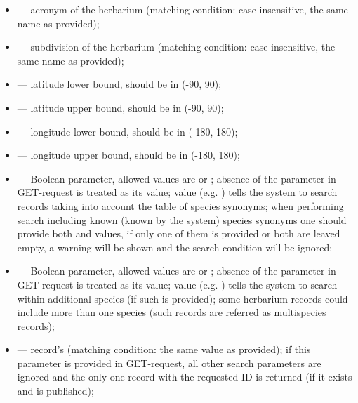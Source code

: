 \documentclass[letterpaper,10pt,english]{sphinxmanual}
\begin{document}
\begin{itemize}
\item {} 
 — acronym of the herbarium (matching condition:
case insensitive, the same name as provided);

\item {} 
 — subdivision of the herbarium (matching condition:
case insensitive, the same name as provided);

\item {} 
 — latitude lower bound, should be in (-90, 90);

\item {} 
 — latitude upper bound, should be in (-90, 90);

\item {} 
 — longitude lower bound, should be in (-180, 180);

\item {} 
 — longitude upper bound, should be in (-180, 180);

\item {} 
 — Boolean parameter, allowed values are  or ; absence of the parameter
in GET-request is treated as its  value;  value (e.g. )
tells the system to search records taking into account the table of species synonyms;
 when performing search including known
(known by the system) species synonyms one should provide
both  and  values,
if only one of them is provided or both are leaved empty,
a warning will be shown and the search condition will be ignored;

\item {} 
 — Boolean parameter, allowed values are  or ;
absence of the parameter in GET-request is treated as its  value;
 value (e.g. ) tells the system to
search within additional species (if such is provided);
some herbarium records could include more than one species (such records are
referred as multispecies records);

\item {} 
 — record’s  (matching condition: the same value as provided);
if this parameter is provided in GET-request,
all other search parameters are ignored and the only one record
with the requested ID is returned (if it exists and is published);


\end{itemize}
\end{document}
